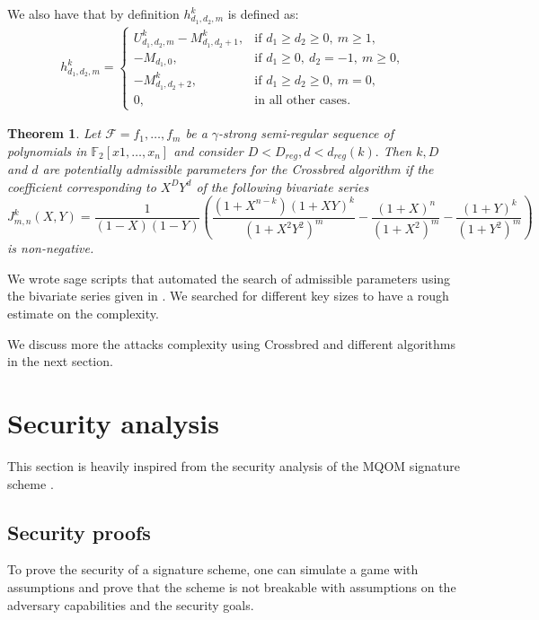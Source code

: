 \documentclass[english]{article}
\newtheorem{theorem}{Theorem}[section]
\begin{document}
		We also have that by definition \( h_{d_1, d_2, m}^k \) is defined as:
		\begin{align}
			h_{d_1, d_2, m}^k =
			\begin{cases}
				U_{d_1, d_2, m}^k - M_{d_1, d_2 + 1}^k, & \text{if } d_1 \geq d_2 \geq 0,\ m \geq 1, \\
				- M_{d_1, 0}, & \text{if } d_1 \geq 0,\ d_2 = -1,\ m \geq 0, \\
				- M_{d_1, d_2 + 2}^k, & \text{if } d_1 \geq d_2 \geq 0,\ m = 0, \\
				0, & \text{in all other cases}.
			\end{cases}
		\end{align}
		
		\begin{theorem}\label{serie_J}
			Let $\mathcal{F} = {f_1,\dots,f_m}$ be a $\gamma$-strong semi-regular sequence of polynomials in $\mathbb{F}_2[x1,\dots,x_n]$ and consider $D < D_{reg}, d < d_{reg}(k).$ Then $k, D$ and $d$ are potentially admissible parameters for the Crossbred algorithm if the coefficient corresponding to $X^DY^d$ of the following bivariate series
			$$
			J_{m, n}^k(X, Y) = \frac{1}{(1-X)(1-Y)}\left(\frac{(1+X^{n-k})(1+XY)^k}{(1+X^2Y^2)^m} - \frac{(1+X)^n}{(1+X^2)^m} - \frac{(1+Y)^k}{(1+Y^2)^m}\right)
			$$
			is non-negative.
		\end{theorem}
		
		We wrote sage scripts that automated the search of admissible parameters using the bivariate series given in \cite{VID24}. We searched for different key sizes to have a rough estimate on the complexity.
		
		We discuss more the attacks complexity using Crossbred and different algorithms in the next section.
		
	\section{Security analysis}
		This section is heavily inspired from the security analysis of the MQOM signature scheme \cite{MQOMv2}.
		
		\subsection{Security proofs}
		To prove the security of a signature scheme, one can simulate a game with assumptions and prove that the scheme is not breakable with assumptions on the adversary capabilities and the security goals.
		
\end{document}
